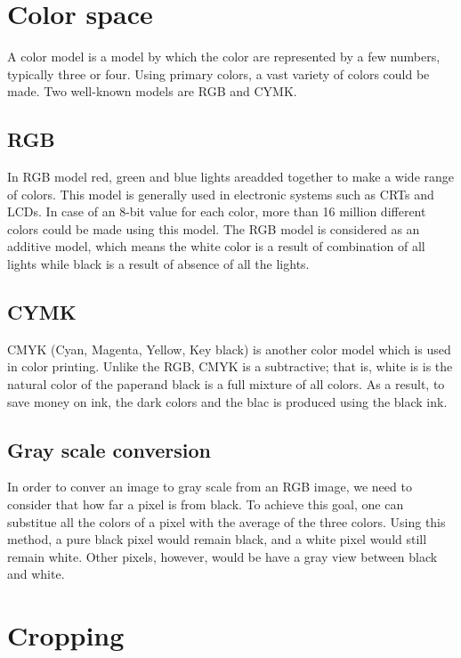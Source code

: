 \documentclass{article}
\begin{document}
\section{Color space}    
	A color model is a model by which the color are represented by a few numbers, typically three or four. Using primary colors, a vast variety of colors could be made. Two well-known models are RGB and CYMK.      

	\subsection{RGB}
		In RGB model red, green and blue lights areadded together to make a wide range of colors. This model is generally used in electronic systems such as CRTs and LCDs. In case of an 8-bit value for each color, more than 16 million different colors
		could be made using this model. The RGB model is considered as an additive model, which means the white color is a result of combination of all lights while black is a result of absence of all the lights.
	

	\subsection{CYMK}

		CMYK (Cyan, Magenta, Yellow, Key black) is another color model which is used in color printing. Unlike the RGB, CMYK is a subtractive; that is, white is is the natural color of the paperand black is a full mixture of all colors.
		As a result, to save money on ink, the dark colors and the blac is produced using the black ink.

	\subsection{Gray scale conversion}

		In order to conver an image to gray scale from an RGB image, we need to consider that how far a pixel is from black. To achieve this goal, one can substitue all the colors of a pixel with the average of the three colors. Using
		this method, a pure black pixel would remain black, and a white pixel would still remain white. Other pixels, however, would be have a gray view between black and white.

\section{Cropping}
\end{document}
